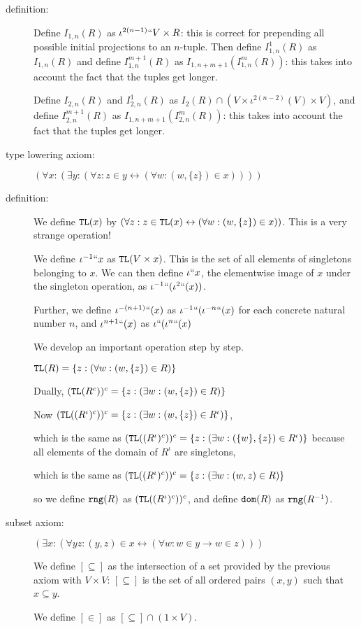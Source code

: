 \documentclass[112pt]{article}
\begin{document}
\begin{description}
\item[definition:]  Define $I_{1,n}(R)$ as $\iota^{2(n-1)}``V \times R$:  this is correct for prepending all possible initial projections
to an $n$-tuple.  Then define $I^1_{1,n}(R)$ as $I_{1,n}(R)$ and define $I^{m+1}_{1,n}(R)$ as $I_{1,n+m+1}(I^m_{1,n}(R))$:  this takes
into account the fact that the tuples get longer.

Define $I_{2,n}(R)$ and $I^1_{2,n}(R)$ as $I_2(R) \cap (V\times \iota^{2(n-2)}(V)\times V)$, and define $I^{m+1}_{2,n}(R)$ as $I_{1,n+m+1}(I^m_{2,n}(R))$:  this takes
into account the fact that the tuples get longer.

\item[type lowering axiom:]  $(\forall x:(\exists y:(\forall z:z \in y \leftrightarrow (\forall w:(w,\{z\}) \in x))))$

\item[definition:]  
We define ${\tt TL}(x)$ by $(\forall z:z \in {\tt TL}(x) \leftrightarrow (\forall w:(w,\{z\}) \in x))$.  This is a very strange operation!

We define $\iota^{-1}``x$ as ${\tt TL}(V \times x)$.  This is the set of all elements of singletons
belonging to $x$.  We can then define $\iota``x$, the elementwise image of $x$ under the singleton operation, as $\iota^{-1}``(\iota^2``(x))$.

Further, we define $\iota^{-(n+1)}``(x)$ as $\iota^{-1}``(\iota^{-n}``(x)$ for each concrete natural number $n$, and $\iota^{n+1}``(x)$ as $\iota``(\iota^{n}``(x)$ 

We develop an important operation step by step.

${\tt TL}(R) = \{z:(\forall w:(w,\{z\})\in R)\}$

Dually, $({\tt TL}(R^c))^c = \{z:(\exists w:(w,\{z\})\in R)\}$

Now $({\tt TL}((R^\iota)^c))^c = \{z:(\exists w:(w,\{z\})\in R^\iota)\}$,

which is the same as $({\tt TL}((R^\iota)^c))^c = \{z:(\exists w:(\{w\},\{z\})\in R^\iota)\}$ because all elements
of the domain of $R^{\iota}$ are singletons,

which is the same as $({\tt TL}((R^\iota)^c))^c = \{z:(\exists w:(w,z)\in R)\}$

so we define ${\tt rng}(R)$ as $({\tt TL}((R^\iota)^c))^c$,
and define ${\tt dom}(R)$ as ${\tt rng}(R^{-1})$.

\item[subset axiom:]  $(\exists x:(\forall yz:(y,z) \in x \leftrightarrow (\forall w:w \in y \rightarrow w \in z)))$

We define $[\subseteq]$ as the intersection of a set provided by the previous axiom with $V \times V$:  $[\subseteq]$ is the set of all ordered pairs $(x,y)$ such that $x \subseteq y$.

We define $[\in]$ as $[\subseteq]\cap (1 \times V)$.



\end{description}
\end{document}

